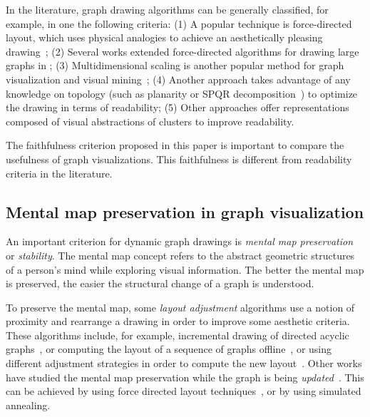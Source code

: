 \documentclass[10pt,journal,cspaper,compsoc]{IEEEtran}
\begin{document}
In the literature, graph drawing algorithms can be generally classified, for example, in one the following criteria: (1)
A popular technique is force-directed
layout, which uses physical analogies to achieve an
aesthetically pleasing drawing~\cite{kamada1989algorithm,DBLP:books/ph/BattistaETT99,brandes2001drawing}; (2) 
Several works extended force-directed algorithms for drawing large graphs in \cite{harel2001fast, walshaw2001multilevel}; (3)
Multidimensional scaling is another popular method for graph visualization and visual mining~\cite{DBLP:conf/gd/BrandesP06}; (4) Another approach takes advantage of any knowledge on topology (such as planarity or SPQR decomposition~\cite{newbery1989edge,feng1995draw,gutwenger2002graph,mutzel2003spqr,eades2010graph}) to optimize the drawing in terms of readability; (5) Other approaches offer representations
composed of visual abstractions of clusters to improve readability.


The faithfulness criterion proposed in this paper is important to compare the usefulness of graph visualizations. This faithfulness is different from readability criteria in the literature.


\subsection{Mental map preservation in graph visualization}

An important criterion for dynamic graph drawings is {\em mental map preservation}~\cite{peter1991mentalmap} or \emph{stability}\cite{paulisch1990edge}.
The mental map concept refers to the abstract geometric structures of a person's mind while exploring visual information. The better the mental map is preserved, the easier the structural change
of a graph is understood.

To preserve the mental map, some \emph{layout adjustment} algorithms use a notion of proximity
and rearrange a drawing in order to improve some aesthetic criteria. These algorithms include, for example, incremental drawing of directed acyclic graphs~\cite{north1996incremental}, or computing the layout of a sequence of graphs offline~\cite{diehl2002graphs}, or using different adjustment strategies in order to compute the new layout~\cite{huang1998fully}.
Other works have studied the mental map preservation while the graph is being \emph{updated}~\cite{frishman2004dynamic,lee2006mental,lin2011mental}.
This can be achieved by using force directed layout techniques~\cite{frishman2004dynamic}, or
 by using simulated annealing\cite{lee2006mental}. 
\end{document}
